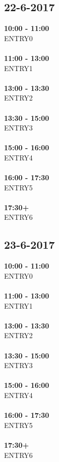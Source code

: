 \documentclass{uva-inf-article}
\begin{document}
\subsection{22-6-2017}
\textbf{10:00 - 11:00}\\
ENTRY0\\\\
\textbf{11:00 - 13:00}\\
ENTRY1\\\\
\textbf{13:00 - 13:30}\\
ENTRY2\\\\
\textbf{13:30 - 15:00}\\
ENTRY3\\\\
\textbf{15:00 - 16:00}\\
ENTRY4\\\\
\textbf{16:00 - 17:30}\\
ENTRY5\\\\
\textbf{17:30+}\\
ENTRY6\\
\subsection{23-6-2017}
\textbf{10:00 - 11:00}\\
ENTRY0\\\\
\textbf{11:00 - 13:00}\\
ENTRY1\\\\
\textbf{13:00 - 13:30}\\
ENTRY2\\\\
\textbf{13:30 - 15:00}\\
ENTRY3\\\\
\textbf{15:00 - 16:00}\\
ENTRY4\\\\
\textbf{16:00 - 17:30}\\
ENTRY5\\\\
\textbf{17:30+}\\
ENTRY6\\
\end{document}
